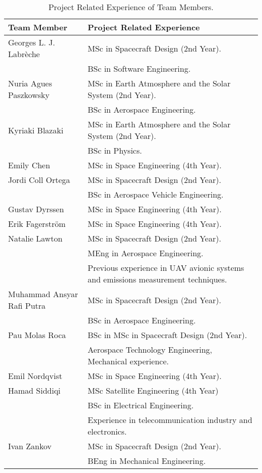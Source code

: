 \begin{table}[H]
\centering
\begin{tabular}{|l|m{11cm}|}
\hline
\textbf{Team Member} & \textbf{Project Related Experience} \\ \hline
Georges L. J. Labrèche & MSc in Spacecraft Design (2nd Year). \\& BSc in Software Engineering.\\ \hline
Nuria Agues Paszkowsky & MSc in Earth Atmosphere and the Solar System (2nd Year). \\& BSc in Aerospace Engineering.\\ \hline
Kyriaki Blazaki & MSc in Earth Atmosphere and the Solar System (2nd Year). \\& BSc in Physics. \\ \hline
Emily Chen & MSc in Space Engineering (4th Year). \\ \hline
Jordi Coll Ortega & MSc in Spacecraft Design (2nd Year). \\& BSc in Aerospace Vehicle Engineering. \\ \hline
Gustav Dyrssen &  MSc in Space Engineering (4th Year).\\ \hline
Erik Fagerström & MSc in Space Engineering (4th Year). \\ \hline
Natalie Lawton & MSc in Spacecraft Design (2nd Year). \\& MEng in Aerospace Engineering.\\& Previous experience in UAV avionic systems and emissions measurement techniques. \\ \hline
Muhammad Ansyar Rafi Putra & MSc in Spacecraft Design (2nd Year). \\& BSc in Aerospace Engineering. \\ \hline
Pau Molas Roca & BSc in MSc in Spacecraft Design (2nd Year). \\& Aerospace Technology Engineering, Mechanical experience. \\ \hline
Emil Nordqvist & MSc in Space Engineering (4th Year). \\ \hline
Hamad Siddiqi & MSc Satellite Engineering (4th Year) \\&  BSc in Electrical Engineering.\\& Experience in telecommunication industry and electronics.  \\ \hline
Ivan Zankov & MSc in Spacecraft Design (2nd Year). \\& BEng in Mechanical Engineering.\\ \hline
\end{tabular}
\caption{Project Related Experience of Team Members.}
\label{tab:team-member-experience}
\end{table}
\raggedbottom